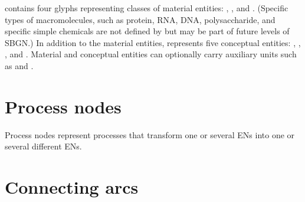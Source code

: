  \SBGNERLone{} contains four glyphs representing classes of material entities: , ,  and .  (Specific types of macromolecules, such as protein, RNA, DNA, polysaccharide, and specific simple chemicals are not defined by \SBGNERLone but may be part of future levels of SBGN.)  In addition to the material entities, \SBGNERLone{} represents five conceptual entities: , , ,  and .  Material and conceptual entities can optionally carry auxiliary units such as  and .
 
















 


 
\section{Process nodes}\label{sec:PNs}

Process nodes represent processes that transform one or several ENs into one or several different ENs.
 




 
\section{Connecting arcs}\label{sec:arcs}

